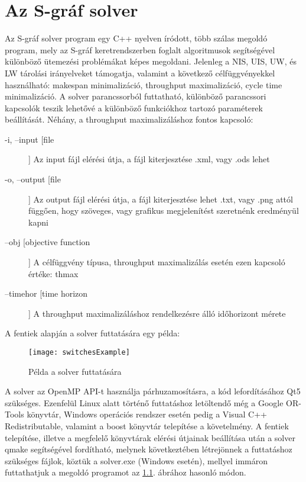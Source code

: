 \chapter{Az S-gráf solver} \label{s-graph_framework}
Az S-gráf solver program egy C++ nyelven íródott, több szálas megoldó program, mely az S-gráf keretrendszerben foglalt algoritmusok segítségével különböző ütemezési problémákat képes megoldani.
Jelenleg a NIS, UIS, UW, és LW tárolási irányelveket támogatja, valamint a következő célfüggvényekkel használható: makespan minimalizáció, throughput maximalizáció, cycle time minimalizáció.
A solver parancssorból futtatható, különböző parancssori kapcsolók teszik lehetővé a különböző funkciókhoz tartozó paraméterek beállítását.
Néhány, a throughput maximalizáláshoz fontos kapcsoló:
\begin{description}
\item[-i, --input [file]] Az input fájl elérési útja, a fájl kiterjesztése .xml, vagy .ods lehet
\item[-o, --output [file]] Az output fájl elérési útja, a fájl kiterjesztése lehet .txt, vagy .png attól függően, hogy szöveges, vagy grafikus megjelenítést szeretnénk eredményül kapni
\item[--obj [objective function]] A célfüggvény típusa, throughput maximalizálás esetén ezen kapcsoló értéke: thmax
\item[--timehor [time horizon]] A throughput maximalizáláshoz rendelkezésre álló időhorizont mérete 
\end{description}
A fentiek alapján a solver futtatására egy példa:
\begin{figure}[H]
\begin{center}
\texttt{[image: switchesExample]}
\caption{Példa a solver futtatására}
\label{switchExample}
\end{center}
\end{figure}
A solver az OpenMP API-t használja párhuzamosításra, a kód lefordításához Qt5 szükséges.
Ezenfelül Linux alatt történő futtatáshoz letöltendő még a Google OR-Tools könyvtár, Windows operációs rendszer esetén pedig a Visual C++ Redistributable, valamint a boost könyvtár telepítése a követelmény.
A fentiek telepítése, illetve a megfelelő könyvtárak elérési útjainak beállítása után a solver qmake segítségével fordítható, melynek következtében létrejönnek a futtatáshoz szükséges fájlok, köztük a solver.exe (Windows esetén), mellyel immáron futtathatjuk a megoldó programot az \ref{switchExample}. ábrához hasonló módon.   
